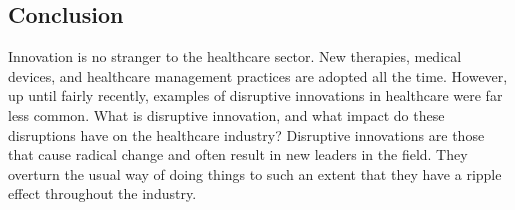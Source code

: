 \documentclass[12pt]{article}
\begin{document}
\begin{flushleft}


\section{
\textbf{\large Conclusion}}

\textsf{\large Innovation is no stranger to the healthcare sector. New therapies, medical devices, and healthcare management practices are adopted all the time. However, up until fairly recently, examples of disruptive innovations in healthcare were far less common. What is disruptive innovation, and what impact do these disruptions have on the healthcare industry? Disruptive innovations are those that cause radical change and often result in new leaders in the field. They overturn the usual way of doing things to such an extent that they have a ripple effect throughout the industry.} 
\end{flushleft}
\end{document}
